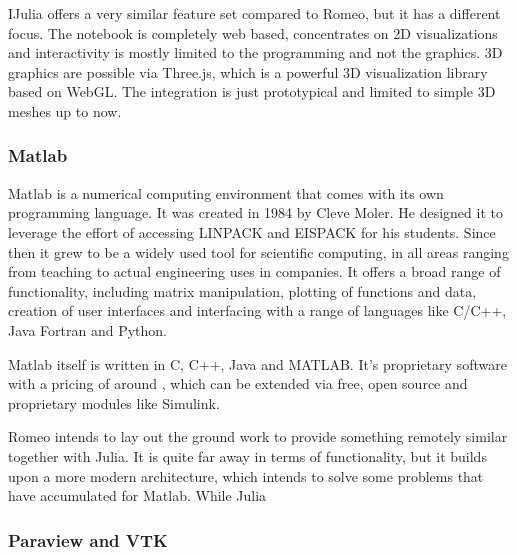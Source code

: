 IJulia offers a very similar feature set compared to Romeo, but it has a different focus.
The notebook is completely web based, concentrates on 2D visualizations and interactivity is mostly limited to the programming and not the graphics.
3D graphics are possible via Three.js, which is a powerful 3D visualization library based on WebGL.
The integration is just prototypical and limited to simple 3D meshes up to now.


\subsubsection{Matlab}

\ac{Matlab} is a numerical computing environment that comes with its own programming language.
It was created in 1984 by Cleve Moler. He designed it to leverage the effort of accessing LINPACK and EISPACK for his students.
Since then it grew to be a widely used tool for scientific computing, in all areas ranging from teaching to actual engineering uses in companies.
It offers a broad range of functionality, including matrix manipulation, plotting of functions and data, creation of user interfaces and interfacing with a range of languages like C/C++, Java Fortran and Python.

\ac{Matlab} itself is written in C, C++, Java and MATLAB.
It's proprietary software with a pricing of around  \cite{MatlabPricing}, which can be extended via free, open source and proprietary modules like Simulink.

Romeo intends to lay out the ground work to provide something remotely similar together with Julia. It is quite far away in terms of functionality, but it builds upon a more modern architecture, which intends to solve some problems that have accumulated for Matlab.
While Julia 

\subsubsection{Paraview and VTK}

